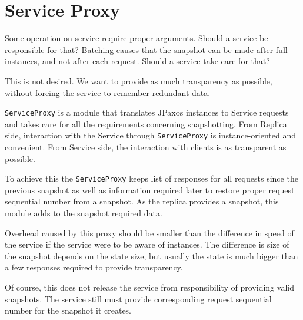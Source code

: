 \section{Service Proxy}
\label{sec:serviceProxy}

Some operation on service require proper arguments. Should a service be responsible for that? Batching causes that the snapshot can be made after full instances, and not after each request. Should a service take care  for that?

This is not desired. We want to provide as much transparency as possible, without forcing the service to remember redundant data.

\texttt{ServiceProxy} is a module that translates JPaxos instances to Service requests and takes care for all the requirements concerning snapshotting. From Replica side, interaction with the Service through \texttt{ServiceProxy} is instance-oriented and convenient. From Service side, the interaction with clients is as transparent as possible.

To achieve this the \texttt{ServiceProxy} keeps list of responses for all requests since the previous snapshot as well as information required later to restore proper request sequential number from a snapshot.
As the replica provides a snapshot, this module adds to the snapshot required data.

Overhead caused by this proxy should be smaller than the difference in speed of the service if the service were to be aware of instances. The difference is size of the snapshot depends on the state size, but usually the state is much bigger than a few responses required to provide transparency.

Of course, this does not release the service from responsibility of providing valid snapshots. The service still must provide corresponding request sequential number for the snapshot it creates.
